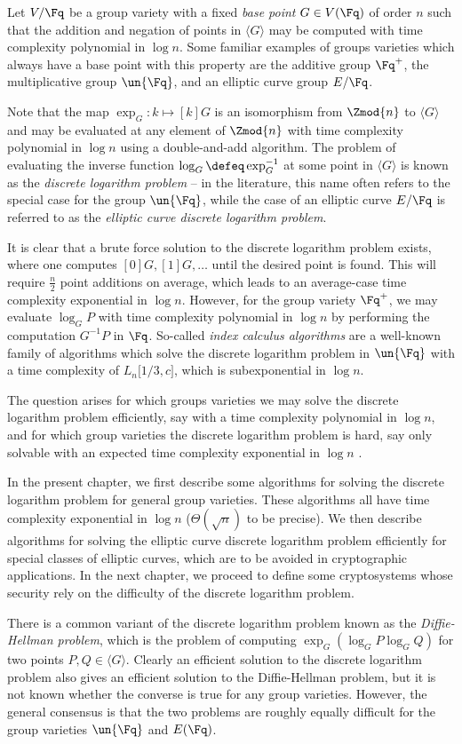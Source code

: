 Let $V / \Fq$ be a group variety with a fixed \emph{base point} $G \in V(\Fq)$ of order $n$ such that the addition and negation of points in $\langle G \rangle$ may be computed with time complexity polynomial in $\log n$. Some familiar examples of groups varieties which always have a base point with this property are the additive group $\Fq^+$, the multiplicative group $\un{\Fq}$, and an elliptic curve group $E / \Fq$.

Note that the map $\exp_G : k \mapsto [k] G$ is an isomorphism from $\Zmod{n}$ to $\langle G \rangle$ and may be evaluated at any element of $\Zmod{n}$ with time complexity polynomial in $\log n$ using a double-and-add algorithm. The problem of evaluating the inverse function $\log_G \defeq \exp_G^{-1}$ at some point in $\langle G \rangle$ is known as the \emph{discrete logarithm problem} -- in the literature, this name often refers to the special case for the group $\un{\Fq}$, while the case of an elliptic curve $E / \Fq$ is referred to as the \emph{elliptic curve discrete logarithm problem}.

It is clear that a brute force solution to the discrete logarithm problem exists, where one computes $[0] G, [1] G, \ldots$ until the desired point is found. This will require $\frac{n}{2}$ point additions on average, which leads to an average-case time complexity exponential in $\log n$. However, for the group variety $\Fq^+$, we may evaluate $\log_G P$ with time complexity polynomial in $\log n$ by performing the computation $G^{-1} P$ in $\Fq$. So-called \emph{index calculus algorithms} are a well-known family of algorithms which solve the discrete logarithm problem in $\un{\Fq}$ with a time complexity of $L_n \lbrack 1/3, c \rbrack$, which is subexponential in $\log n$.

The question arises for which groups varieties we may solve the discrete logarithm problem efficiently, say with a time complexity polynomial in $\log n$, and for which group varieties the discrete logarithm problem is hard, say only solvable with an expected time complexity exponential in $\log n$ \citep{hyperelliptic}.

In the present chapter, we first describe some algorithms for solving the discrete logarithm problem for general group varieties. These algorithms all have time complexity exponential in $\log n$ ($\Theta(\sqrt{n})$ to be precise). We then describe algorithms for solving the elliptic curve discrete logarithm problem efficiently for special classes of elliptic curves, which are to be avoided in cryptographic applications. In the next chapter, we proceed to define some cryptosystems whose security rely on the difficulty of the discrete logarithm problem.

There is a common variant of the discrete logarithm problem known as the \emph{Diffie-Hellman problem}, which is the problem of computing $\exp_G(\log_G P \log_G Q)$ for two points $P, Q \in \langle G \rangle$. Clearly an efficient solution to the discrete logarithm problem also gives an efficient solution to the Diffie-Hellman problem, but it is not known whether the converse is true for any group varieties. However, the general consensus is that the two problems are roughly equally difficult for the group varieties $\un{\Fq}$ and $E(\Fq)$.
